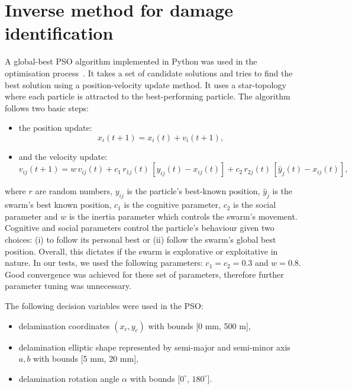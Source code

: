 \section{Inverse method for damage identification}

A global-best PSO algorithm implemented in Python was used in the optimisation process~\cite{MirandaLesterJames}.
It takes a set of candidate solutions and tries to find the best solution using a position-velocity update method. 
It uses a star-topology where each particle is attracted to the best-performing particle.
The algorithm follows two basic steps:
\begin{itemize}
	\item the position update:
	\begin{equation}
		x_i(t+1) = x_i(t) + v_i(t+1),\label{eq:position_update}
	\end{equation}
	\item and the velocity update:
	\begin{equation}
		v_{ij}(t+1) = w\, v_{ij}(t) + c_1\, r_{1j}(t) \,[y_{ij}(t) - x_{ij}(t)] + c_2\, r_{2j}(t)\,[\hat{y}_j(t) - x_{ij}(t)],\label{eq:velocity_update}
	\end{equation}
\end{itemize}
where $r$ are random numbers, $y_{ij}$ is the particle's best-known position, $\hat{y}_j$ is the swarm's best known position, $c_1$ is the cognitive parameter, $c_2$ is the social parameter and $w$ is the inertia parameter which controls the swarm's movement.
Cognitive and social parameters control the particle's behaviour given two choices: (i) to follow its personal best or (ii) follow the swarm’s global best position.
Overall, this dictates if the swarm is explorative or exploitative in nature. 
In our tests, we used the following parameters: $c_1 = c_2 = 0.3$ and $w=0.8$.
Good convergence was achieved for these set of parameters, therefore further parameter tuning was unnecessary.

The following decision variables were used in the PSO:
\begin{itemize}
	\item delamination coordinates $(x_c, y_c)$ with bounds [0 mm, 500 m],
	\item delamination elliptic shape represented by semi-major and semi-minor axis $a, b$ with bounds [5 mm, 20 mm],
	\item delamination rotation angle $\alpha$ with bounds [$0^\circ$, $180^\circ$].
\end{itemize}

